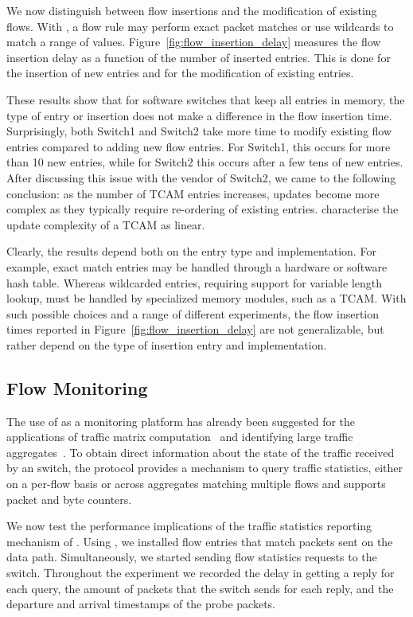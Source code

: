 We now distinguish between flow insertions and the modification of existing
flows.  With \of, a flow rule may perform exact packet matches or use
wildcards to match a range of values. Figure~\ref{fig:flow_insertion_delay}
measures the flow insertion delay as a function of the number of inserted
entries. This is done for the insertion of new entries and for the modification
of existing entries.

These results show that for software switches that keep all entries in memory,
the type of entry or insertion does not make a difference in the flow insertion
time.  Surprisingly, both Switch1 and Switch2 take more time to modify existing
flow entries compared to adding new flow entries.  For Switch1, this occurs for
more than 10 new entries, while for Switch2 this occurs after a few tens of new
entries.  After discussing this issue with the vendor of Switch2, we came to the
following conclusion: as the number of TCAM entries increases, updates become
more complex as they typically require re-ordering of existing entries.
 characterise the update complexity of a TCAM as linear.

Clearly, the results depend both on the entry type and implementation.  For
example, exact match entries may be handled through a hardware or software hash
table. Whereas wildcarded entries, requiring support for variable length
lookup, must be handled by specialized memory modules, such as a TCAM\@. With such
possible choices and a range of different experiments, the flow insertion times
reported in Figure~\ref{fig:flow_insertion_delay} are not generalizable, but
rather depend on the type of insertion entry and implementation.

\subsection{Flow Monitoring}\label{sec:results-monitoring}

The use of \of as a monitoring platform has already been suggested for the
applications of traffic matrix computation~ and
identifying large traffic aggregates~. To
obtain direct information about the state of the traffic received by an \of
switch, the \of protocol provides a mechanism to query traffic statistics,
either on a per-flow basis or across aggregates matching multiple flows and
supports packet and byte counters. 

We now test the performance implications of the traffic statistics reporting
mechanism of \of. Using \oflops, we installed flow entries that match packets sent
on the data path. Simultaneously, we started sending flow statistics requests to
the switch. Throughout the experiment we recorded the delay in getting a reply for
each query, the amount of packets that the switch sends for each reply, and the
departure and arrival timestamps of the probe packets.

